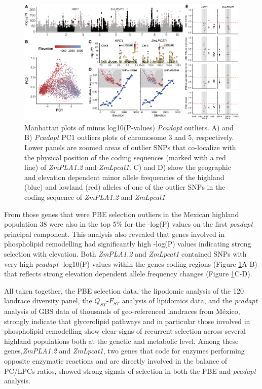\documentclass[9pt,twocolumn,twoside]{BioRxiv}
\begin{document}
\begin{figure}[h]
\begin{center}
\includegraphics[width=0.4\paperwidth]{Figures/Fig_2.png}
\caption{Manhattan plots of minus log10(P‐values) \textit{Pcadapt} outliers. A) and B) \textit{Pcadapt} PC1 outliers plots of chromosome 3 and 5, respectively. 
Lower panels are zoomed areas of outlier SNPs that co-localize with the physical position of the coding sequences (marked with a red line) of \textit{ZmPLA1.2} and \textit{ZmLpcat1}. C) and D) show the geographic and elevation dependent minor allele frequencies of the highland (blue) and lowland (red) alleles of one of the outlier SNPs in the coding sequence of \textit{ZmPLA1.2} and \textit{ZmLpcat1}}
\label{Fig2}
\end{center}
\end{figure} 

From those genes that were PBE selection outliers in the Mexican highland population 38 were also in the top 5\% for the -log(P) values on the first \textit{pcadapt} principal component. 
This analysis also revealed that genes involved in phospholipid remodelling had significantly high -log(P) values indicating strong selection with elevation. 
Both \textit{ZmPLA1.2} and \textit{ZmLpcat1} contained SNPs with very high \textit{pcadapt} -log10(P) values within the genes coding regions (Figure \ref{Fig2}A-B) that reflects strong elevation dependent allele frequency changes  (Figure \ref{Fig2}C-D).

All taken together, the PBE selection data, the lipodomic analysis of the 120 landrace diversity panel, the $Q_{ST}$-$F_{ST}$ analysis of lipidomics data, and the \textit{pcadapt} analysis of GBS data of thousands of geo-referenced landraces from México, strongly indicate that glycerolipid pathways and in particular those involved in phospholipid remodelling show clear signs of recurrent selection across several highland populations both at the genetic and metabolic level. 
Among these genes,\textit{ZmPLA1.2} and \textit{ZmLpcat1}, two genes that code for enzymes performing opposite enzymatic reactions and are directly involved in the balance of PC/LPCs ratios, showed strong signals of selection in both the PBE and \textit{pcadapt} analysis.
\end{document}
